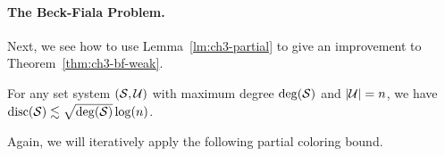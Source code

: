 \paragraph{The Beck-Fiala Problem.}
Next, we see how to use Lemma~\ref{lm:ch3-partial} to give an
improvement to Theorem~\ref{thm:ch3-bf-weak}. 

\begin{theorem}\label{thm:ch3-bf}
  For any set system \((\mathcal{S}, \mathcal{U})\) with maximum degree
  \(\operatorname{deg}(\mathcal{S})\) and \(|\mathcal{U}| = n\), 
  we have \(\operatorname{disc}(\mathcal{S}) \lesssim \sqrt{\operatorname{deg}(\mathcal{S})} \log(n)\). 
\end{theorem}
Again, we will iteratively apply the following partial coloring bound.

